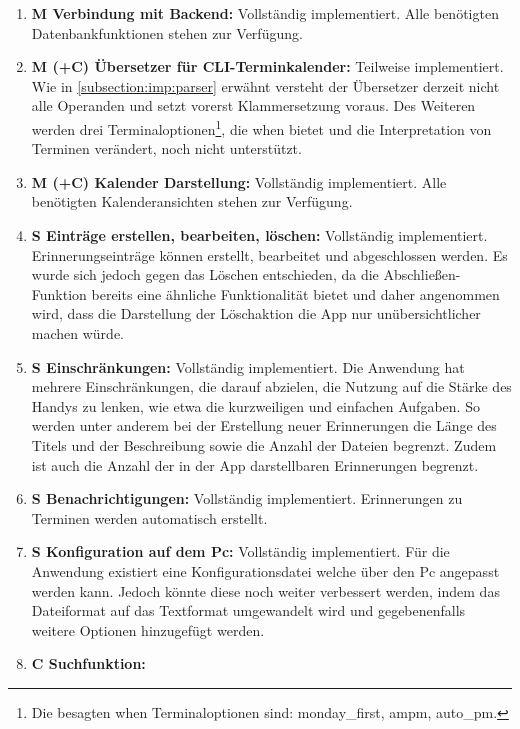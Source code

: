 \begin{enumerate}%
	\item \textbf{M Verbindung mit Backend:} %
		Vollständig implementiert. Alle benötigten Datenbankfunktionen stehen zur Verfügung.%
	\item \textbf{M (+C) Übersetzer für CLI-Terminkalender:} %
		Teilweise implementiert. Wie in \ref{subsection:imp:parser} erwähnt versteht der Übersetzer derzeit nicht alle Operanden und setzt vorerst Klammersetzung voraus. Des Weiteren werden drei Terminaloptionen\footnote{Die besagten when Terminaloptionen sind: monday\_first, ampm, auto\_pm\cite{cli_when}.}, die \glqq when\grqq{} bietet und die Interpretation von Terminen verändert, noch nicht unterstützt.%
	\item \textbf{M (+C) Kalender Darstellung:} %
		Vollständig implementiert. Alle benötigten Kalenderansichten stehen zur Verfügung. %
	\item \textbf{S Einträge erstellen, bearbeiten, löschen:} %
		Vollständig implementiert. Erinnerungseinträge können erstellt, bearbeitet und abgeschlossen werden.\newline
		Es wurde sich jedoch gegen das Löschen entschieden, da die Abschließen-Funktion bereits eine ähnliche Funktionalität bietet und daher angenommen wird, dass die Darstellung der Löschaktion die App nur unübersichtlicher machen würde.
	\item \textbf{S Einschränkungen:} %
		Vollständig implementiert. Die Anwendung hat mehrere Einschränkungen, die darauf abzielen, die Nutzung auf die Stärke des Handys zu lenken, wie etwa die kurzweiligen und einfachen Aufgaben. %
		So werden unter anderem bei der Erstellung neuer Erinnerungen die Länge des Titels und der Beschreibung sowie die Anzahl der Dateien begrenzt. Zudem ist auch die Anzahl der in der App darstellbaren Erinnerungen begrenzt.%
	\item \textbf{S Benachrichtigungen:} %
		Vollständig implementiert. Erinnerungen zu Terminen werden automatisch erstellt.%
	\item \textbf{S Konfiguration auf dem Pc:}
		Vollständig implementiert. Für die Anwendung existiert eine Konfigurationsdatei welche über den Pc angepasst werden kann. %
		Jedoch könnte diese noch weiter verbessert werden, indem das Dateiformat auf das Textformat umgewandelt wird und gegebenenfalls weitere Optionen hinzugefügt werden.%
	\item \textbf{C Suchfunktion:} %

\end{enumerate}
